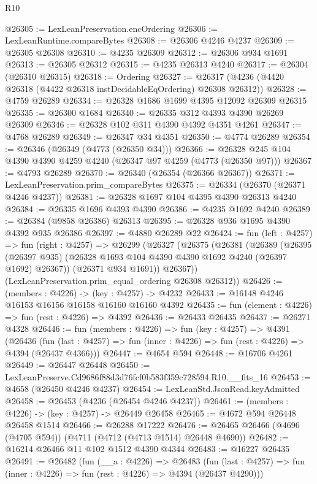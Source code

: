 \begin{lexlean}{R10}
\begin{coremodule}
@26305 := LexLeanPreservation.encOrdering
@26306 := LexLeanRuntime.compareBytes
@26308 := @26306 @4246 @4237
@26309 := @26305 @26308
@26310 := @4235 @26309
@26312 := @26306 @934 @1691
@26313 := @26305 @26312
@26315 := @4235 @26313 @4240
@26317 := @26304 (@26310 @26315)
@26318 := Ordering
@26327 := @26317 (@4236 (@4420 @26318 (@4422 @26318 instDecidableEqOrdering) @26308 @26312))
@26328 := @4759 @26289
@26334 := @26328 @1686 @1699 @4395 @12092 @26309 @26315
@26335 := @26300 @1684
@26340 := @26335 @312 @4393 @4390 @26269 @26309
@26346 := @26328 @102 @311 @4390 @4392 @4351 @4261
@26347 := @4768 @26289
@26349 := @26347 @34 @4351
@26350 := @4774 @26289
@26354 := @26346 (@26349 (@4773 (@26350 @34)))
@26366 := @26328 @245 @104 @4390 @4390 @4259 @4240 (@26347 @97 @4259 (@4773 (@26350 @97)))
@26367 := @4793 @26289
@26370 := @26340 (@26354 (@26366 @26367))
@26371 := LexLeanPreservation.prim_compareBytes
@26375 := @26334 (@26370 (@26371 @4246 @4237))
@26381 := @26328 @1697 @104 @4395 @4390 @26313 @4240
@26384 := @26335 @1696 @4393 @4390
@26386 := @4235 @1692 @4240
@26389 := @26384 (@9858 @26386) @26313
@26395 := @26328 @936 @1695 @4390 @4392 @935 @26386
@26397 := @4880 @26289 @22
@26424 := fun (left : @4257) =>
  fun (right : @4257) =>
  @26299
    (@26327
      (@26375
        (@26381
          (@26389
            (@26395 (@26397 @935) (@26328 @1693 @104 @4390 @4390 @1692 @4240 (@26397 @1692) @26367))
            (@26371 @934 @1691))
          @26367))
      (LexLeanPreservation.prim_equal_ordering @26308 @26312))
@26426 := (members : @4226) -> (key : @4257) -> @4232
@26433 := @16148 @4246 @16153 @16156 @16158 @16160 @16160 @4392
@26435 := fun (element : @4226) => fun (rest : @4226) => @4392
@26436 := @26433 @26435
@26437 := @26271 @4328
@26446 := fun (members : @4226) =>
  fun (key : @4257) =>
  @4391
    (@26436
      (fun (last : @4257) => fun (inner : @4226) => fun (rest : @4226) => @4394 (@26437 @4366)))
@26447 := @4654 @594
@26448 := @16706 @4261
@26449 := @26447 @26448
@26450 := LexLeanPreserve.Cd9686f88d3d76fcf0b583f359c728594.R10.__fits_16
@26453 := @4658 (@26450 @4246 @4237)
@26454 := LexLeanStd.JsonRead.keyAdmitted
@26458 := @26453 (@4236 (@26454 @4246 @4237))
@26461 := (members : @4226) -> (key : @4257) -> @26449 @26458
@26465 := @4672 @594 @26448 @26458 @1514
@26466 := @26288 @17222
@26476 := @26465 @26466 (@4696 (@4705 @594)) (@4711 (@4712 (@4713 @1514) @26448 @4690))
@26482 := @16214 @26466 @11 @102 @1512 @4390 @4344
@26483 := @16227 @26435
@26491 := @26482
    (fun (__a : @4226) =>
    @26483
      (fun (last : @4257) => fun (inner : @4226) => fun (rest : @4226) => @4394 (@26437 @4290)))

\end{coremodule}
\end{lexlean}
